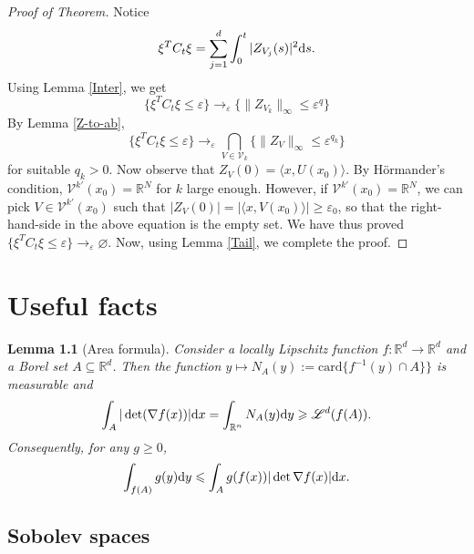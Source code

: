 \documentclass[twoside, 12pt]{book}
\numberwithin{equation}{chapter}
\def\theequation{\arabic{chapter}.\arabic{equation}}
\newtheorem{lemma}[theorem]{Lemma}
\def\mR{{\mathbb R}}
\def\sL{{\mathscr L}}
\def\sV{{\mathscr V}}
\def\<{\langle}
\def\>{\rangle}
\def\geq{\geqslant}
\def\leq{\leqslant}
\def\d{\text{\rm{d}}}
\def\eps{\varepsilon}
\begin{document}
	\begin{proof}[Proof of Theorem]
		Notice 
		\begin{align}\label{CtoZ}\xi^TC_t\xi=\sum_{j=1}^d \int_0^t |Z_{V_j}(s)|^2\d s.\end{align}
		Using Lemma \ref{Inter}, we get 
		$$\{\xi^TC_t\xi\leq \eps\}\rightarrow_\eps \{ \|Z_{V_k}\|_\infty\leq \eps^q\}$$
		By Lemma \ref{Z-to-ab}, 
		$$\{\xi^TC_t\xi\leq \eps\}\rightarrow_\eps \bigcap_{V\in \sV_k}\{ \|Z_{V}\|_\infty\leq \eps^{q_k}\}$$
		for suitable $q_k > 0.$ Now observe that $Z_V (0) = \<x, U (x_0 )\>$. By H\"ormander’s condition, $\sV^{k'}(x_0) = \mR^N$ for $k$ large enough. However, if $\sV^{k'}(x_0) = \mR^N$, we can pick $V \in \sV^{k'}(x_0)$ such that $|Z_V (0)| =|\<x, V (x_0 )\>| \geq \eps_0$, so that the right-hand-side in the above equation is the empty set. We have thus proved $\{\xi^TC_t\xi \leq\eps\} \rightarrow_\eps \varnothing$. Now, using  Lemma \ref{Tail}, we complete the proof.
	\end{proof}
	 

	\appendix
	\chapter{Useful facts}
	    \setcounter{equation}{0}
	    \renewcommand\theequation{A.\arabic{equation}}
	    \begin{lemma}[Area formula]
	    	Consider a locally Lipschitz function $f: \mR^d \to \mR^d$ and a Borel set $A\subseteq \mR^d$. Then the function $y\mapsto N_A(y):= \mathrm{card}\{f^{-1}(y)\cap A\}\}$ is measurable and 
	    	\begin{equation*}
	    		\int_{A} |\det (\nabla f(x))| \d x = \int_{\mR^n} N_A(y) \d y \geq \sL^d(f(A)). 
	    	\end{equation*}
	    	Consequently, for any $g\geq 0$, 
	    	\begin{equation}\label{eq:area}
	    		\int_{f(A)}g(y)\d y\leq \int_{A} g(f(x)) |\det \nabla f(x)|\d x. 
	    	\end{equation}
	    \end{lemma}
	
	\section{Sobolev spaces}
	
\end{document}
